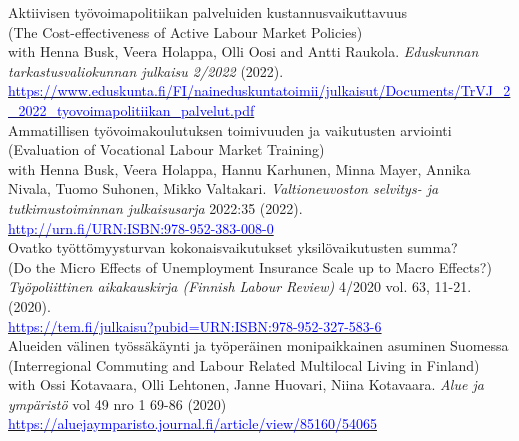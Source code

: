 \documentclass[16pt]{article}
\begin{document}
\noindent Aktiivisen työvoimapolitiikan palveluiden kustannusvaikuttavuus \\
\noindent (The Cost-effectiveness of Active Labour Market Policies) \\
\noindent with Henna Busk, Veera Holappa, Olli Oosi and Antti Raukola. \textit{Eduskunnan tarkastusvaliokunnan julkaisu 2/2022} (2022). \\
\noindent  \href{https://www.eduskunta.fi/FI/naineduskuntatoimii/julkaisut/Documents/TrVJ\_2\_2022\_tyovoimapolitiikan\_palvelut.pdf}{\textcolor{blue}{https://www.eduskunta.fi/FI/naineduskuntatoimii/julkaisut/Documents/TrVJ\_2\_2022\_tyovoimapolitiikan\_palvelut.pdf}} \\

\noindent Ammatillisen ty\"{o}voimakoulutuksen toimivuuden ja vaikutusten arviointi \\
\noindent (Evaluation of Vocational Labour Market Training) \\
\noindent with Henna Busk, Veera Holappa, Hannu Karhunen, Minna Mayer, Annika Nivala, Tuomo Suhonen, Mikko Valtakari.  \textit{Valtioneuvoston selvitys- ja tutkimustoiminnan julkaisusarja} 2022:35 (2022).  \\
\noindent \href{http://urn.fi/URN:ISBN:978-952-383-008-0}{\textcolor{blue}{http://urn.fi/URN:ISBN:978-952-383-008-0}} \\

\noindent Ovatko ty\"{o}tt\"{o}myysturvan kokonaisvaikutukset yksil\"{o}vaikutusten summa? \\
\noindent (Do the Micro Effects of Unemployment Insurance Scale up to Macro Effects?) \\
\noindent  \textit{Ty\"{o}poliittinen aikakauskirja (Finnish Labour Review)} 4/2020 vol. 63, 11-21.  (2020). \\
\noindent  \href{https://tem.fi/julkaisu?pubid=URN:ISBN:978-952-327-583-6} {\textcolor{blue}{https://tem.fi/julkaisu?pubid=URN:ISBN:978-952-327-583-6}}\\

\noindent Alueiden v\"{a}linen ty\"{o}ss\"{a}k\"{a}ynti ja ty\"{o}per\"{a}inen monipaikkainen asuminen Suomessa \\
\noindent (Interregional Commuting and Labour Related Multilocal Living in Finland) \\
\noindent with Ossi Kotavaara, Olli Lehtonen, Janne Huovari, Niina Kotavaara. \textit{Alue ja ympäristö} vol 49 nro 1 69-86 (2020) \\
\noindent  \href{https://aluejaymparisto.journal.fi/article/view/85160/54065}{\textcolor{blue}{https://aluejaymparisto.journal.fi/article/view/85160/54065}} \\
 
\end{document}
